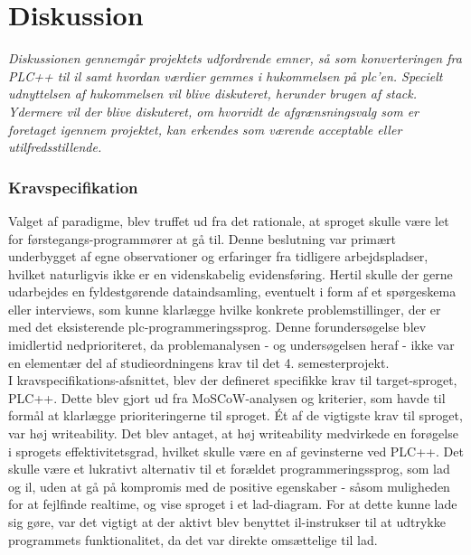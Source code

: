 \chapter{Diskussion}\label{sec:Diskussion}
\textit{Diskussionen gennemgår projektets udfordrende emner, så som konverteringen fra PLC++ til \gls{il} samt hvordan værdier gemmes i hukommelsen på \gls{plc}'en.
Specielt udnyttelsen af hukommelsen vil blive diskuteret, herunder brugen af stack. 
Ydermere vil der blive diskuteret, om hvorvidt de afgrænsningsvalg som er foretaget igennem projektet, kan erkendes som værende acceptable eller utilfredsstillende.}

\subsection*{Kravspecifikation}
Valget af paradigme, blev truffet ud fra det rationale, at sproget skulle være let for førstegangs-programmører at gå til. Denne beslutning var primært underbygget af egne observationer og erfaringer fra tidligere arbejdspladser, hvilket naturligvis ikke er en videnskabelig evidensføring. Hertil skulle der gerne udarbejdes en fyldestgørende dataindsamling, eventuelt i form af et spørgeskema eller interviews, som kunne klarlægge hvilke konkrete problemstillinger, der er med det eksisterende \gls{plc}-programmeringssprog. Denne forundersøgelse blev imidlertid nedprioriteret, da problemanalysen - og undersøgelsen heraf - ikke var en elementær del af studieordningens krav til det 4. semesterprojekt. \\

\noindent I kravspecifikations-afsnittet, blev der defineret specifikke krav til target-sproget, PLC++. Dette blev gjort ud fra MoSCoW-analysen og kriterier, som havde til formål at klarlægge prioriteringerne til sproget. Ét af de vigtigste krav til sproget, var høj writeability. Det blev antaget, at høj writeability medvirkede en forøgelse i sprogets effektivitetsgrad, hvilket skulle være en af gevinsterne ved PLC++. Det skulle være et lukrativt alternativ til et forældet programmeringssprog, som \gls{lad} og \gls{il}, uden at gå på kompromis med de positive egenskaber - såsom muligheden for at fejlfinde realtime, og vise sproget i et \gls{lad}-diagram. 
For at dette kunne lade sig gøre, var det vigtigt at der aktivt blev benyttet \gls{il}-instrukser til at udtrykke programmets funktionalitet, da det var direkte omsættelige til \gls{lad}. \\

